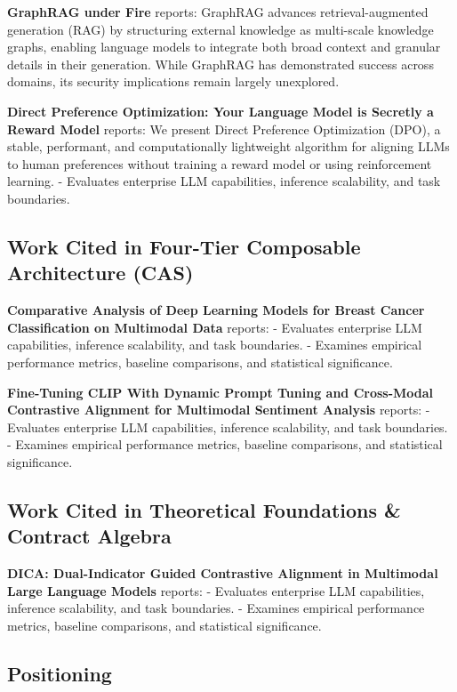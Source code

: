 \documentclass[10pt,journal,compsoc,twocolumn]{IEEEtran}
\begin{document}
\textbf{GraphRAG under Fire} \cite{arxiv_2501_14050} reports: GraphRAG advances retrieval-augmented generation (RAG) by structuring external knowledge as multi-scale knowledge graphs, enabling language models to integrate both broad context and granular details in their generation. While GraphRAG has demonstrated success across domains, its security implications remain largely unexplored.

\textbf{Direct Preference Optimization: Your Language Model is Secretly a Reward Model} \cite{arxiv_2305_18290} reports: We present Direct Preference Optimization (DPO), a stable, performant, and computationally lightweight algorithm for aligning LLMs to human preferences without training a reward model or using reinforcement learning. - Evaluates enterprise LLM capabilities, inference scalability, and task boundaries.


\subsection{Work Cited in Four-Tier Composable Architecture (CAS)}


\textbf{Comparative Analysis of Deep Learning Models for Breast Cancer Classification on Multimodal Data} \cite{crossref_10_1145_3689096_3689462} reports: - Evaluates enterprise LLM capabilities, inference scalability, and task boundaries. - Examines empirical performance metrics, baseline comparisons, and statistical significance.

\textbf{Fine-Tuning CLIP With Dynamic Prompt Tuning and Cross-Modal Contrastive Alignment for Multimodal Sentiment Analysis} \cite{crossref_10_1109_access_2026_3656309} reports: - Evaluates enterprise LLM capabilities, inference scalability, and task boundaries. - Examines empirical performance metrics, baseline comparisons, and statistical significance.


\subsection{Work Cited in Theoretical Foundations \& Contract Algebra}


\textbf{DICA: Dual-Indicator Guided Contrastive Alignment in Multimodal Large Language Models} \cite{crossref_10_18653_v1_2026_findings_acl_1933} reports: - Evaluates enterprise LLM capabilities, inference scalability, and task boundaries. - Examines empirical performance metrics, baseline comparisons, and statistical significance.


\subsection{Positioning}
\end{document}
